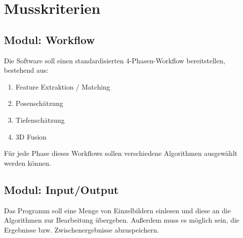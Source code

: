 
\section{Musskriterien}
\subsection{Modul: Workflow}
Die Software soll einen standardisierten 4-Phasen-Workflow bereitstellen, bestehend aus:

\begin{enumerate}
		\item Feature Extraktion / Matching
		\item Posenschätzung
		\item Tiefenschätzung
		\item 3D Fusion
\end{enumerate}
Für jede Phase dieses Workflows sollen verschiedene Algorithmen ausgewählt werden können.
\subsection{Modul: Input/Output}
Das Programm soll eine Menge von Einzelbildern einlesen und diese an die Algorithmen zur Bearbeitung übergeben. Außerdem muss es möglich sein, die Ergebnisse bzw. Zwischenergebnisse abzuspeichern.
